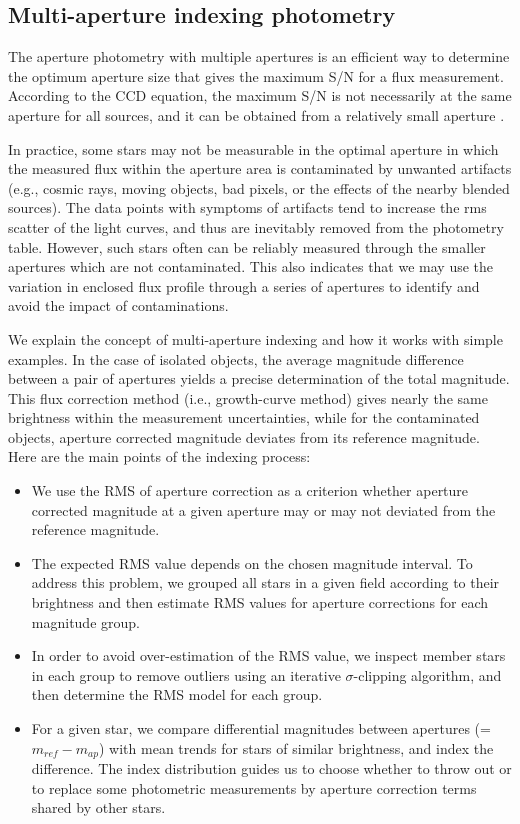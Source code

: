 \subsection{Multi-aperture indexing photometry}
The aperture photometry with multiple apertures is an efficient way to determine the optimum aperture size that gives the maximum S/N for a flux measurement.  According to the CCD equation, the maximum S/N is not necessarily at the same aperture for all sources, and it can be obtained from a relatively small aperture \citep{how89}.

In practice, some stars may not be measurable in the optimal aperture in which the measured flux within the aperture area is contaminated by unwanted artifacts (e.g., cosmic rays, moving objects, bad pixels, or the effects of the nearby blended sources).  The data points with symptoms of artifacts tend to increase the rms scatter of the light curves, and thus are inevitably removed from the photometry table.  However, such stars often can be reliably measured through the smaller apertures which are not contaminated.  This also indicates that we may use the variation in enclosed flux profile through a series of apertures to identify and avoid the impact of contaminations.

We explain the concept of multi-aperture indexing and how it works with simple examples.  In the case of isolated objects, the average magnitude difference between a pair of apertures yields a precise determination of the total magnitude.  This flux correction method (i.e., growth-curve method) gives nearly the same brightness within the measurement uncertainties, while for the contaminated objects, aperture corrected magnitude deviates from its reference magnitude.    Here are the main points of the indexing process: \begin{itemize}
\item{We use the RMS of aperture correction as a criterion whether aperture corrected magnitude at a given aperture may or may not deviated from the reference magnitude.}

\item{The expected RMS value depends on the chosen magnitude interval.  To address this problem, we grouped all stars in a given field according to their brightness and then estimate RMS values for aperture corrections for each magnitude group.}

\item{In order to avoid over-estimation of the RMS value, we inspect member stars in each group to remove outliers using an iterative $\sigma$-clipping algorithm, and then determine the RMS model for each group.}

\item{For a given star, we compare differential magnitudes between apertures (=$m_{ref}-m_{ap}$) with mean trends for stars of similar brightness, and index the difference.  The index distribution guides us to choose whether to throw out or to replace some photometric measurements by aperture correction terms shared by other stars.}
\end{itemize}

